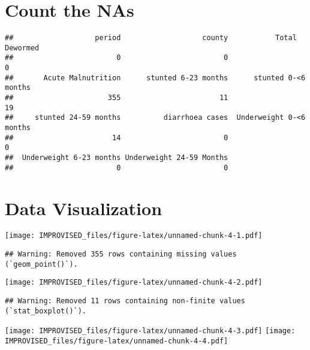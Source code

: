 \documentclass[
]{article}
\begin{document}
\hypertarget{count-the-nas}{%
\section{Count the NAs}\label{count-the-nas}}

\begin{verbatim}
##                   period                   county           Total Dewormed 
##                        0                        0                        0 
##       Acute Malnutrition      stunted 6-23 months      stunted 0-<6 months 
##                      355                       11                       19 
##     stunted 24-59 months          diarrhoea cases  Underweight 0-<6 months 
##                       14                        0                        0 
##  Underweight 6-23 months Underweight 24-59 Months 
##                        0                        0
\end{verbatim}

\hypertarget{data-visualization}{%
\section{Data Visualization}\label{data-visualization}}

\texttt{[image: IMPROVISED\_files/figure-latex/unnamed-chunk-4-1.pdf]}

\begin{verbatim}
## Warning: Removed 355 rows containing missing values (`geom_point()`).
\end{verbatim}

\texttt{[image: IMPROVISED\_files/figure-latex/unnamed-chunk-4-2.pdf]}

\begin{verbatim}
## Warning: Removed 11 rows containing non-finite values (`stat_boxplot()`).
\end{verbatim}

\texttt{[image: IMPROVISED\_files/figure-latex/unnamed-chunk-4-3.pdf]}
\texttt{[image: IMPROVISED\_files/figure-latex/unnamed-chunk-4-4.pdf]}
\end{document}

